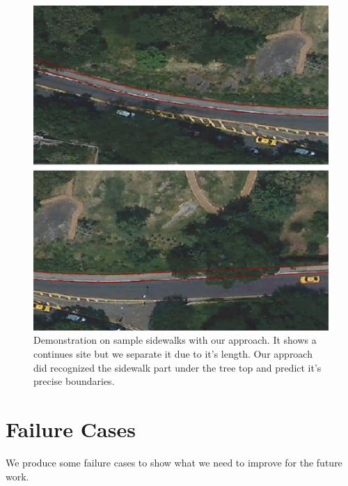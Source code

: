 \begin{figure}[H]
    \centering
    \includegraphics[width=\textwidth]{Figures/ny3.png}
    \caption[Sample Sidewalk 6]{Demonstration on sample sidewalks with our approach. It shows a continues site but we separate it due to it's length. Our approach did recognized the sidewalk part under the tree top and predict it's precise boundaries.}
    \label{fig:ny3}
\end{figure}

\section{Failure Cases}

We produce some failure cases to show what we need to improve for the future work. 

